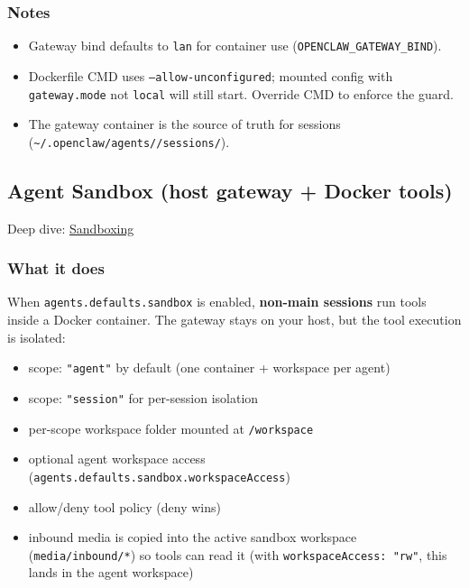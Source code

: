 \subsubsection{Notes}


\begin{itemize}
  \item Gateway bind defaults to \texttt{lan} for container use (\texttt{OPENCLAW\_GATEWAY\_BIND}).
  \item Dockerfile CMD uses \texttt{--allow-unconfigured}; mounted config with \texttt{gateway.mode} not \texttt{local} will still start. Override CMD to enforce the guard.
  \item The gateway container is the source of truth for sessions (\texttt{\textasciitilde{}/.openclaw/agents//sessions/}).
\end{itemize}


\subsection{Agent Sandbox (host gateway + Docker tools)}


Deep dive: \href{/gateway/sandboxing}{Sandboxing}

\subsubsection{What it does}


When \texttt{agents.defaults.sandbox} is enabled, \textbf{non-main sessions} run tools inside a Docker
container. The gateway stays on your host, but the tool execution is isolated:

\begin{itemize}
  \item scope: \texttt{"agent"} by default (one container + workspace per agent)
  \item scope: \texttt{"session"} for per-session isolation
  \item per-scope workspace folder mounted at \texttt{/workspace}
  \item optional agent workspace access (\texttt{agents.defaults.sandbox.workspaceAccess})
  \item allow/deny tool policy (deny wins)
  \item inbound media is copied into the active sandbox workspace (\texttt{media/inbound/*}) so tools can read it (with \texttt{workspaceAccess: "rw"}, this lands in the agent workspace)
\end{itemize}


